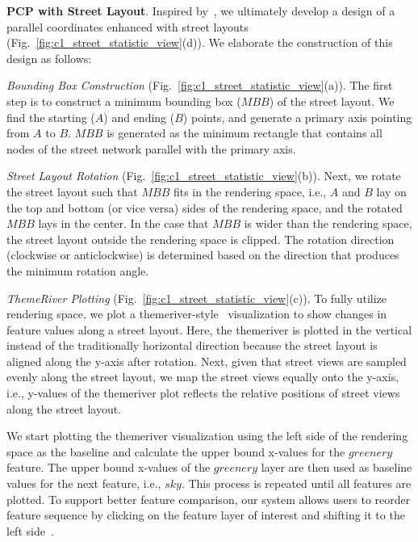 \vspace*{2mm}
\noindent
\textbf{PCP with Street Layout}. Inspired by~\cite{qu_2007_visual}, we ultimately develop a design of a parallel coordinates enhanced with street layouts (Fig.~\ref{fig:c1_street_statistic_view}(d)).
We elaborate the construction of this design as follows:

\vspace*{1mm}
\noindent
\textit{Bounding Box Construction} (Fig.~\ref{fig:c1_street_statistic_view}(a)).
The first step is to construct a minimum bounding box ($MBB$) of the street layout.
We find the starting ($A$) and ending ($B$) points, and generate a primary axis pointing from $A$ to $B$.
$MBB$ is generated as the minimum rectangle that contains all nodes of the street network parallel with the primary axis.

\vspace*{1mm}
\noindent
\textit{Street Layout Rotation} (Fig.~\ref{fig:c1_street_statistic_view}(b)).
Next, we rotate the street layout such that $MBB$ fits in the rendering space, i.e., $A$ and $B$ lay on the top and bottom (or vice versa) sides of the rendering space, and the rotated $MBB$ lays in the center.
In the case that $MBB$ is wider than the rendering space, the street layout outside the rendering space is clipped.
The rotation direction (clockwise or anticlockwise) is determined based on the direction that produces the minimum rotation angle.

\vspace*{1mm}
\noindent
\textit{ThemeRiver Plotting} (Fig.~\ref{fig:c1_street_statistic_view}(c)).
To fully utilize rendering space, we plot a themeriver-style~\cite{havre_2002_themeriver} visualization to show changes in feature values along a street layout.
Here, the themeriver is plotted in the vertical instead of the traditionally horizontal direction because the street layout is aligned along the y-axis after rotation.
Next, given that street views are sampled evenly along the street layout, we map the street views equally onto the y-axis, i.e., y-values of the themeriver plot reflects the relative positions of street views along the street layout.

We start plotting the themeriver visualization using the left side of the rendering space as the baseline and calculate the upper bound x-values for the $greenery$ feature.
The upper bound x-values of the $greenery$ layer are then used as baseline values for the next feature, i.e., $sky$.
This process is repeated until all features are plotted.
To support better feature comparison, our system allows users to reorder feature sequence by clicking on the feature layer of interest and shifting it to the left side~\cite{byron_2008_stacked}.

